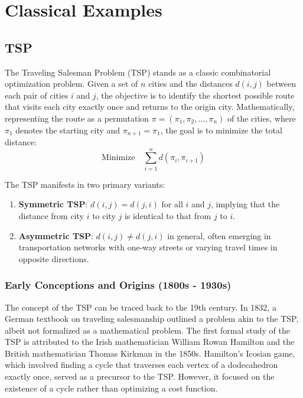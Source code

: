 \documentclass[acmsmall]{acmart}
\begin{document}
	\section{Classical Examples}
	\subsection{TSP}
	
	The Traveling Salesman Problem (TSP) stands as a classic combinatorial optimization problem. Given a set of \(n\) cities and the distances \(d(i, j)\) between each pair of cities \(i\) and \(j\), the objective is to identify the shortest possible route that visits each city exactly once and returns to the origin city. Mathematically, representing the route as a permutation \(\pi = (\pi_1, \pi_2, \ldots, \pi_n)\) of the cities, where \(\pi_1\) denotes the starting city and \(\pi_{n + 1}=\pi_1\), the goal is to minimize the total distance:
	\[
	\text{Minimize} \quad \sum_{i = 1}^{n} d(\pi_i, \pi_{i + 1})
	\]
	
	The TSP manifests in two primary variants:
	\begin{enumerate}
		\item \textbf{Symmetric TSP}: \(d(i, j)=d(j, i)\) for all \(i\) and \(j\), implying that the distance from city \(i\) to city \(j\) is identical to that from \(j\) to \(i\).
		\item \textbf{Asymmetric TSP}: \(d(i, j)\neq d(j, i)\) in general, often emerging in transportation networks with one-way streets or varying travel times in opposite directions.
	\end{enumerate}
	
	\subsubsection{Early Conceptions and Origins (1800s - 1930s)}
	
	\hspace{1.2em}The concept of the TSP can be traced back to the 19th century.\cite{J2014The} In 1832, a German textbook on traveling salesmanship outlined a problem akin to the TSP, albeit not formalized as a mathematical problem. The first formal study of the TSP is attributed to the Irish mathematician William Rowan Hamilton and the British mathematician Thomas Kirkman in the 1850s. Hamilton's Icosian game, which involved finding a cycle that traverses each vertex of a dodecahedron exactly once, served as a precursor to the TSP. However, it focused on the existence of a cycle rather than optimizing a cost function.
	
\end{document}
